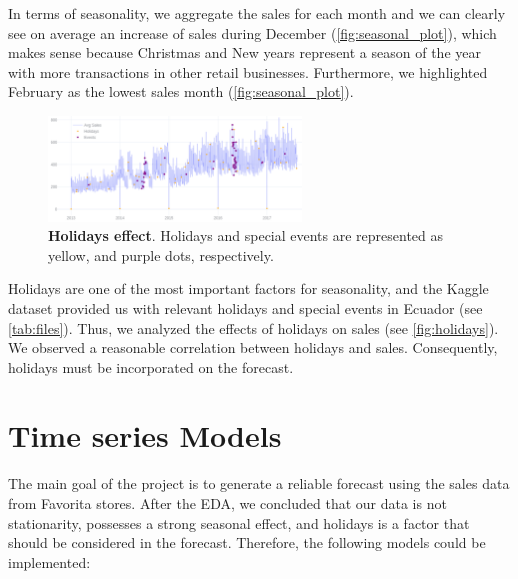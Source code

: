 In terms of seasonality, we aggregate the sales for each month and we can clearly see on average an increase of sales during December (\autoref{fig:seasonal_plot}), which makes sense because Christmas and New years represent a season of the year with more transactions in other retail businesses. Furthermore, we highlighted February as the lowest sales month (\autoref{fig:seasonal_plot}). 

\begin{figure}[!htb]
  \centering
  \includegraphics[width=0.6\textwidth]{plots/eda/holidayeffects.png}
  \caption[Holidays effect]{\textbf{Holidays effect}. Holidays and special events are represented as yellow, and purple dots, respectively.}
  \label{fig:holidays}
\end{figure}

Holidays are one of the most important factors for seasonality, and the Kaggle dataset provided us with relevant holidays and special events in Ecuador (see \autoref{tab:files}). Thus, we analyzed the effects of holidays on sales (see \autoref{fig:holidays}). We observed a reasonable correlation between holidays and sales. Consequently, holidays must be incorporated on the forecast.  

\clearpage

\section[Time series Models]{Time series Models}
\label{sec:forecast}

The main goal of the project is to generate a reliable forecast using the sales data from Favorita stores. After the EDA, we concluded that our data is not stationarity, possesses a strong seasonal effect, and holidays is a factor that should be considered in the forecast.  Therefore, the following models could be implemented:

